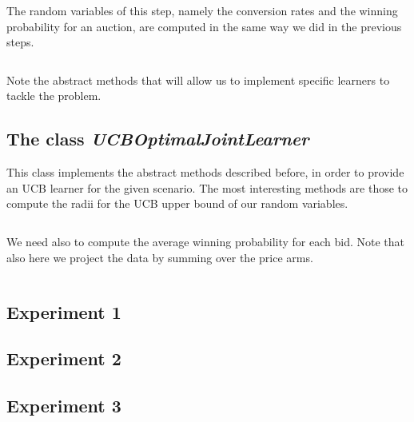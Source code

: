 \documentclass[11pt]{article} %
\begin{document}
The random variables of this step, namely the conversion rates and the winning probability for an auction, are computed
in the same way we did in the previous steps.
\inputminted{python}{code/step6_random_variables_computation.py}

Note the abstract methods that will allow us to implement specific learners to tackle the problem.

\subsection{The class \textit{UCBOptimalJointLearner}}
This class implements the abstract methods described before, in order to provide an UCB learner for the given scenario.
The most interesting methods are those to compute the radii for the UCB upper bound of our random variables.
\inputminted{python}{code/step6_computation_radii.py}

We need also to compute the average winning probability for each bid. Note that also here we project the data by summing
over the price arms.
\inputminted{python}{code/step6_computation_winning_probability.py}


\clearpage
\subsection{Experiment 1}

\clearpage
{\footnotesize}

\clearpage
\subsection{Experiment 2}

\clearpage
{\footnotesize}

\clearpage
\subsection{Experiment 3}

\clearpage
{\footnotesize}
\end{document}
